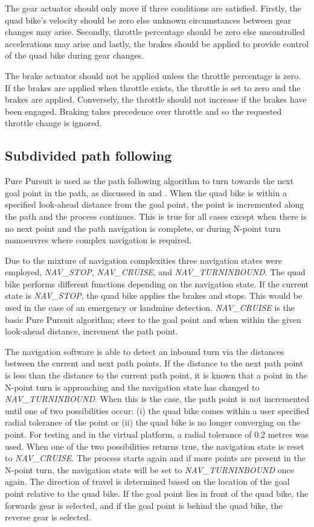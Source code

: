 \documentclass[main.tex]{subfiles}
\begin{document}
The gear actuator should only move if three conditions are satisfied. Firstly, the quad bike's velocity should be zero else unknown circumstances between gear changes may arise. Secondly, throttle percentage should be zero else uncontrolled accelerations may arise and lastly, the brakes should be applied to provide control of the quad bike during gear changes.

The brake actuator should not be applied unless the throttle percentage is zero. If the brakes are applied when throttle exists, the throttle is set to zero and the brakes are applied. Conversely, the throttle should not increase if the brakes have been engaged. Braking takes precedence over throttle and so the requested throttle change is ignored.

\subsection{Subdivided path following}
Pure Pursuit is used as the path following algorithm to turn towards the next goal point in the path, as discussed in  and . When the quad bike is within a specified look-ahead distance from the goal point, the point is incremented along the path and the process continues. This is true for all cases except when there is no next point and the path navigation is complete, or during N-point turn manoeuvres where complex navigation is required.

Due to the mixture of navigation complexities three navigation states were employed, \textit{NAV\_STOP}, \textit{NAV\_CRUISE}, and \textit{NAV\_TURNINBOUND}. The quad bike performs different functions depending on the navigation state. If the current state is \textit{NAV\_STOP}, the quad bike applies the brakes and stops. This would be used in the case of an emergency or landmine detection. \textit{NAV\_CRUISE} is the basic Pure Pursuit algorithm; steer to the goal point and when within the given look-ahead distance, increment the path point.

The navigation software is able to detect an inbound turn via the distances between the current and next path points. If the distance to the next path point is less than the distance to the current path point, it is known that a point in the N-point turn is approaching and the navigation state has changed to \textit{NAV\_TURNINBOUND}. When this is the case, the path point is not incremented until one of two possibilities occur: (i) the quad bike comes within a user specified radial tolerance of the point or (ii) the quad bike is no longer converging on the point. For testing and in the virtual platform, a radial tolerance of 0.2 metres was used. When one of the two possibilities returns true, the navigation state is reset to \textit{NAV\_CRUISE}. The process starts again and if more points are present in the N-point turn, the navigation state will be set to \textit{NAV\_TURNINBOUND} once again. The direction of travel is determined based on the location of the goal point relative to the quad bike. If the goal point lies in front of the quad bike, the forwards gear is selected, and if the goal point is behind the quad bike, the reverse gear is selected.
\end{document}
